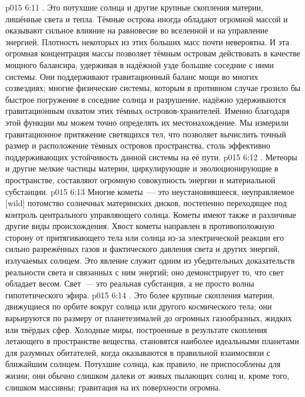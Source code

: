 \vs p015 6:11 \pc {}. Это потухшие солнца и другие крупные скопления материи, лишённые света и тепла. Тёмные острова иногда обладают огромной массой и оказывают сильное влияние на равновесие во вселенной и на управление энергией. Плотность некоторых из этих больших масс почти невероятна. И эта огромная концентрация массы позволяет тёмным островам действовать в качестве мощного балансира, удерживая в надёжной узде большие соседние с ними системы. Они поддерживают гравитационный баланс мощи во многих созвездиях; многие физические системы, которым в противном случае грозило бы быстрое погружение в соседние солнца и разрушение, надёжно удерживаются гравитационным охватом этих тёмных островов\hyp{}хранителей. Именно благодаря этой функции мы можем точно определять их местонахождение. Мы измерили гравитационное притяжение светящихся тел, что позволяет вычислить точный размер и расположение тёмных островов пространства, столь эффективно поддерживающих устойчивость данной системы на её пути.
\vs p015 6:12 \pc {}. Метеоры и другие мелкие частицы материи, циркулирующие и эволюционирующие в пространстве, составляют огромную совокупность энергии и материальной субстанции.
\vs p015 6:13 Многие кометы~--- это неустановившееся, неуправляемое [wild] потомство солнечных материнских дисков, постепенно переходящее под контроль центрального управляющего солнца. Кометы имеют также и различные другие виды происхождения. Хвост кометы направлен в противоположную сторону от притягивающего тела или солнца из\hyp{}за электрической реакции его сильно разрежённых газов и фактического давления света и других энергий, излучаемых солнцем. Это явление служит одним из убедительных доказательств реальности света и связанных с ним энергий; оно демонстрирует то, что свет обладает весом. Свет~--- это реальная субстанция, а не просто волны гипотетического эфира.
\vs p015 6:14 \pc {}. Это более крупные скопления материи, движущиеся по орбите вокруг солнца или другого космического тела; они варьируются по размеру от планетезималей до огромных газообразных, жидких или твёрдых сфер. Холодные миры, построенные в результате скопления летающего в пространстве вещества, становятся наиболее идеальными планетами для разумных обитателей, когда оказываются в правильной взаимосвязи с ближайшим солнцем. Потухшие солнца, как правило, не приспособлены для жизни; они обычно слишком далеки от живых пылающих солнц и, кроме того, слишком массивны; гравитация на их поверхности огромна.
